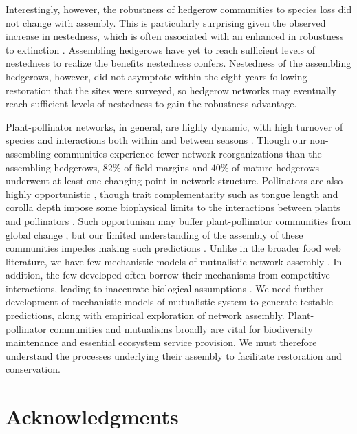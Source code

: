 \documentclass[12pt]{article}
\begin{document}
Interestingly, however, the robustness of hedgerow communities to
species loss did not change with assembly. This is particularly
surprising given the observed increase in nestedness, which is often
associated with an enhanced in robustness to extinction
\citep{Memmott2004}. Assembling hedgerows have yet to reach sufficient
levels of nestedness to realize the benefits nestedness
confers. Nestedness of the assembling hedgerows, however, did not
asymptote within the eight years following restoration that the sites
were surveyed, so hedgerow networks may eventually reach sufficient
levels of nestedness to gain the robustness advantage.

Plant-pollinator networks, in general, are highly dynamic, with high
turnover of species and interactions both within and between seasons
\citep{Burkle2011}. Though our non-assembling communities experience
fewer network reorganizations than the assembling hedgerows, $82\%$ of
field margins and $40\%$ of mature hedgerows underwent at least one
changing point in network structure. Pollinators are also highly
opportunistic \citep{petanidou-2008-564, Vazquez2005b,
  albrecht2010plant}, though trait complementarity such as tongue
length and corolla depth impose some biophysical limits to the
interactions between plants and pollinators
\citep{Vazquez2009evaluating, Vazquez2009, Stang2009, Stang2006,
  Santamaria2007}. Such opportunism may buffer plant-pollinator
communities from global change \citep[e.g.,][]{ramos2012topological,
  kaiser2010robustness}, but our limited understanding of the assembly
of these communities impedes making such predictions
\citep{Vazquez2009, Burkle2011}. Unlike in the broader food web
literature, we have few mechanistic models of mutualistic network
assembly \citep{valdovinos2013adaptive}. In addition, the few
developed often borrow their mechanisms from competitive interactions,
leading to inaccurate biological assumptions
\citep{holland2006comment}. We need further development of mechanistic
models of mutualistic system to generate testable predictions, along
with empirical exploration of network assembly. Plant-pollinator
communities and mutualisms broadly are vital for biodiversity
maintenance and essential ecosystem service provision. We must
therefore understand the processes underlying their assembly to
facilitate restoration and conservation.


\section*{Acknowledgments}
\label{sec:acknowledge}
\end{document}

